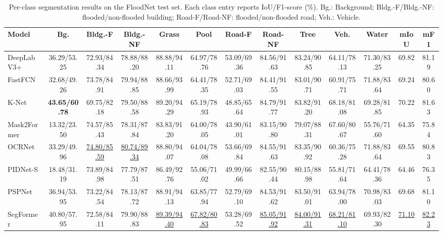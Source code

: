 \documentclass[lettersize,journal]{IEEEtran}
\begin{document}
\begin{table}[!t]
\caption{Per-class segmentation results on the FloodNet test set. Each class entry reports IoU/F1-score (\%). Bg.: Background; Bldg.-F/Bldg.-NF: flooded/non-flooded building; Road-F/Road-NF: flooded/non-flooded road; Veh.: Vehicle.}
\label{tab:floodnet-per-class-results}
\centering
\scriptsize
\setlength{\tabcolsep}{2pt}
\renewcommand{\arraystretch}{1.12}
\begin{tabular}{lcccccccccccc}
\hline
Model & Bg. & Bldg.-F & Bldg.-NF & Grass & Pool & Road-F & Road-NF & Tree & Veh. & Water & mIoU & mF1 \\
\hline
DeepLabV3+\cite{chenRethinkingAtrousConvolution2017} &36.29/53.25 & 72.93/84.34 & 78.88/88.20 & 88.88/94.11 & 64.97/78.76 & 53.09/69.36 & 84.56/91.63 & 83.24/90.85 & 64.11/78.13 & 71.30/83.25 & 69.82 & 81.19 \\
FastFCN\cite{wu2019fastfcn} &32.68/49.26 & 73.78/84.91 & 79.94/88.85 & 88.66/93.99 & 64.41/78.35 & 52.71/69.03 & 84.41/91.55 & 83.01/90.71 & 60.91/75.71 & 71.88/83.64 & 69.24 & 80.60 \\
K-Net\cite{zhang2021knet} &\textbf{43.65/60.78} & 69.75/82.18 & 79.50/88.58 & 89.20/94.29 & 65.19/78.93 & 48.85/65.64 & 84.79/91.77 & 83.82/91.20 & 68.18/81.08 & 69.28/81.85 & 70.22 & 81.63 \\
Mask2Former\cite{NEURIPS2021_950a4152} &13.32/23.50 & 74.57/85.43 & 78.31/87.84 & 83.83/91.20 & 64.00/78.05 & 43.90/61.01 & 83.15/90.80 & 79.07/88.31 & 67.60/80.67 & 55.76/71.60 & 64.35 & 75.84 \\
OCRNet\cite{YuanCW20} &33.29/49.96 & \underline{74.80/85.59} & \underline{80.74/89.34} & 88.80/94.07 & 64.04/78.08 & 53.66/69.84 & 84.55/91.63 & 83.35/90.92 & 60.36/75.28 & 71.88/83.64 & 69.55 & 80.83 \\
PIDNet-S\cite{xu2022pidnet} &18.48/31.19 & 73.89/84.98 & 77.79/87.51 & 86.49/92.76 & 55.06/71.02 & 49.99/66.66 & 82.55/90.44 & 80.15/88.98 & 55.81/71.64 & 64.41/78.36 & 64.46 & 76.35 \\
PSPNet\cite{zhaoPyramidSceneParsing2017a} &36.94/53.95 & 73.22/84.54 & 78.13/87.72 & 88.91/94.13 & 63.85/77.94 & 52.79/69.10 & 84.53/91.62 & 83.50/91.01 & 63.94/78.00 & 70.98/83.03 & 69.68 & 81.10 \\
SegFormer\cite{xie2021segformer} &40.80/57.95 & 72.58/84.11 & 79.90/88.83 & \underline{89.39/94.40} & \underline{67.82/80.83} & 53.28/69.52 & \underline{85.05/91.92} & \underline{84.00/91.31} & \underline{68.21/81.10} & 69.93/82.30 & \underline{71.10} & \underline{82.23} \\

\end{tabular}
\end{table}
\end{document}
